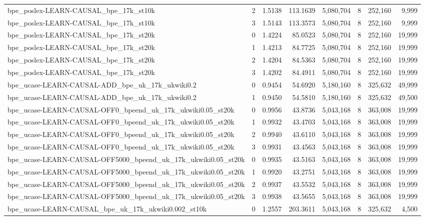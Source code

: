 \begin{tabular}{lrrrrrrr}
bpe\_poslex-LEARN-CAUSAL\_bpe\_17k\_st10k & 2 & 1.5138 & 113.1639 & 5,080,704 & 8 & 252,160 & 9,999 \\
bpe\_poslex-LEARN-CAUSAL\_bpe\_17k\_st10k & 3 & 1.5143 & 113.3573 & 5,080,704 & 8 & 252,160 & 9,999 \\
bpe\_poslex-LEARN-CAUSAL\_bpe\_17k\_st20k & 0 & 1.4224 & 85.0523 & 5,080,704 & 8 & 252,160 & 19,999 \\
bpe\_poslex-LEARN-CAUSAL\_bpe\_17k\_st20k & 1 & 1.4213 & 84.7725 & 5,080,704 & 8 & 252,160 & 19,999 \\
bpe\_poslex-LEARN-CAUSAL\_bpe\_17k\_st20k & 2 & 1.4204 & 84.5363 & 5,080,704 & 8 & 252,160 & 19,999 \\
bpe\_poslex-LEARN-CAUSAL\_bpe\_17k\_st20k & 3 & 1.4202 & 84.4911 & 5,080,704 & 8 & 252,160 & 19,999 \\
bpe\_ucase-LEARN-CAUSAL-ADD\_bpe\_uk\_17k\_ukwiki0.2 & 0 & 0.9454 & 54.6920 & 5,180,160 & 8 & 325,632 & 49,999 \\
bpe\_ucase-LEARN-CAUSAL-ADD\_bpe\_uk\_17k\_ukwiki0.2 & 1 & 0.9450 & 54.5810 & 5,180,160 & 8 & 325,632 & 49,500 \\
bpe\_ucase-LEARN-CAUSAL-OFF0\_bpeend\_uk\_17k\_ukwiki0.05\_st20k & 0 & 0.9956 & 43.8736 & 5,043,168 & 8 & 363,008 & 19,999 \\
bpe\_ucase-LEARN-CAUSAL-OFF0\_bpeend\_uk\_17k\_ukwiki0.05\_st20k & 1 & 0.9932 & 43.4703 & 5,043,168 & 8 & 363,008 & 19,999 \\
bpe\_ucase-LEARN-CAUSAL-OFF0\_bpeend\_uk\_17k\_ukwiki0.05\_st20k & 2 & 0.9940 & 43.6110 & 5,043,168 & 8 & 363,008 & 19,999 \\
bpe\_ucase-LEARN-CAUSAL-OFF0\_bpeend\_uk\_17k\_ukwiki0.05\_st20k & 3 & 0.9931 & 43.4563 & 5,043,168 & 8 & 363,008 & 19,999 \\
bpe\_ucase-LEARN-CAUSAL-OFF5000\_bpeend\_uk\_17k\_ukwiki0.05\_st20k & 0 & 0.9935 & 43.5163 & 5,043,168 & 8 & 363,008 & 19,999 \\
bpe\_ucase-LEARN-CAUSAL-OFF5000\_bpeend\_uk\_17k\_ukwiki0.05\_st20k & 1 & 0.9920 & 43.2751 & 5,043,168 & 8 & 363,008 & 19,999 \\
bpe\_ucase-LEARN-CAUSAL-OFF5000\_bpeend\_uk\_17k\_ukwiki0.05\_st20k & 2 & 0.9937 & 43.5532 & 5,043,168 & 8 & 363,008 & 19,999 \\
bpe\_ucase-LEARN-CAUSAL-OFF5000\_bpeend\_uk\_17k\_ukwiki0.05\_st20k & 3 & 0.9938 & 43.5655 & 5,043,168 & 8 & 363,008 & 19,999 \\
bpe\_ucase-LEARN-CAUSAL\_bpe\_uk\_17k\_ukwiki0.002\_st10k & 0 & 1.2557 & 203.3611 & 5,043,168 & 8 & 325,632 & 4,500 \\

\end{tabular}
